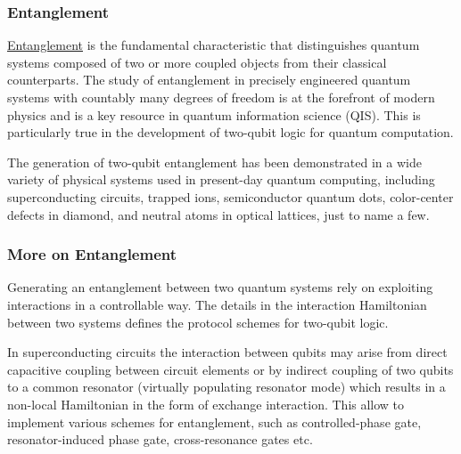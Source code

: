 \documentclass{beamer}
\begin{document}
\begin{frame}
\frametitle{Entanglement}

\begin{block}{}
\href{{https://link.springer.com/content/pdf/10.1007/s11232-007-0098-9.pdf}}{Entanglement} is the fundamental characteristic that distinguishes
quantum systems composed of two or more coupled objects from their
classical counterparts. The study of entanglement in precisely
engineered quantum systems with countably many degrees of freedom is
at the forefront of modern physics and is a key resource in quantum
information science (QIS). This is particularly true in the
development of two-qubit logic for quantum computation.
\end{block}

\begin{block}{}
The
generation of two-qubit entanglement has been demonstrated in a wide
variety of physical systems used in present-day quantum computing,
including superconducting circuits, trapped
ions, semiconductor quantum dots, color-center
defects in diamond, and neutral atoms in optical
lattices, just to name a few.
\end{block}
\end{frame}

\begin{frame}
\frametitle{More on Entanglement}

\begin{block}{}
Generating an entanglement between two quantum systems rely on
exploiting interactions in a controllable way. The details in the
interaction Hamiltonian between two systems defines the protocol
schemes for two-qubit logic.
\end{block}

\begin{block}{}
In  superconducting circuits the
interaction between qubits may arise from direct capacitive coupling
between circuit elements or by indirect coupling of two qubits to a
common resonator (virtually populating resonator mode) which results
in a non-local Hamiltonian in the form of exchange
interaction. This allow to implement various
schemes for entanglement, such as controlled-phase
gate, resonator-induced phase
gate, cross-resonance gates etc.
\end{block}
\end{frame}
\end{document}
